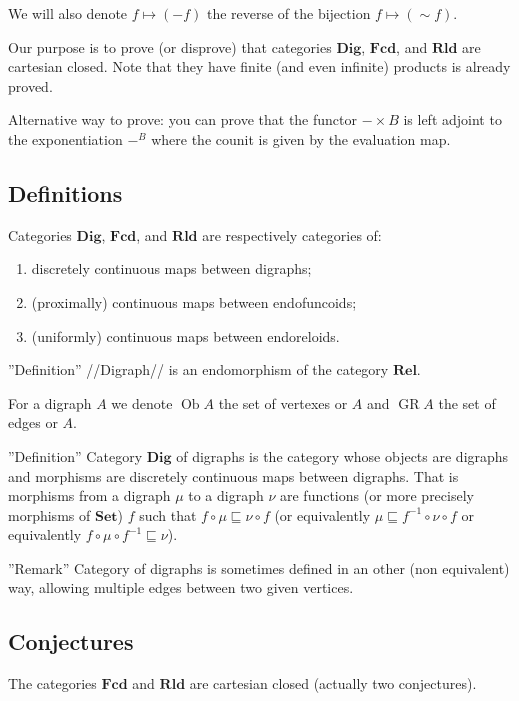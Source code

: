 We will also denote $f\mapsto (-f)$ the reverse of the bijection $f\mapsto (\sim f)$.

Our purpose is to prove (or disprove) that categories $\mathbf{Dig}$, $\mathbf{Fcd}$, and $\mathbf{Rld}$ are cartesian closed. Note that they have finite (and even infinite) products is already proved.

Alternative way to prove:
you can prove that the functor $-\times B$ is left adjoint to the exponentiation $-^B$ where the counit is given by the evaluation map.

\subsection{Definitions}

Categories $\mathbf{Dig}$, $\mathbf{Fcd}$, and $\mathbf{Rld}$ are respectively categories of:
\begin{enumerate}
\item discretely continuous maps between digraphs;
\item (proximally) continuous maps between endofuncoids;
\item (uniformly) continuous maps between endoreloids.
\end{enumerate}

''Definition'' //Digraph// is an endomorphism of the category $\mathbf{Rel}$.

For a digraph $A$ we denote $\operatorname{Ob} A$ the set of vertexes or $A$ and $\operatorname{GR} A$ the set of edges or $A$.

''Definition'' Category $\mathbf{Dig}$ of digraphs is the category whose objects are digraphs and morphisms are discretely continuous maps between digraphs. That is morphisms from a digraph $\mu$ to a digraph $\nu$ are functions (or more precisely morphisms of $\mathbf{Set}$) $f$ such that $f \circ \mu \sqsubseteq \nu \circ f$ (or equivalently $\mu \sqsubseteq f^{- 1} \circ \nu \circ f$ or equivalently $f \circ \mu \circ f^{- 1} \sqsubseteq \nu$).

''Remark'' Category of digraphs is sometimes defined in an other (non equivalent) way, allowing multiple edges between two given vertices.

\subsection{Conjectures}

\begin{conjecture}
  The categories $\mathbf{Fcd}$ and $\mathbf{Rld}$ are
  cartesian closed (actually two conjectures).
\end{conjecture}

